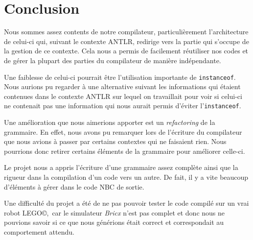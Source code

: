 \section{Conclusion}

Nous sommes assez contents de notre compilateur, particulièrement l'architecture de celui-ci qui, suivant le contexte ANTLR, redirige vers la partie qui s'occupe de la gestion de ce contexte. Cela nous a permis de facilement réutiliser nos codes et de gérer la plupart des parties du compilateur de manière indépendante.

Une faiblesse de celui-ci pourrait être l'utilisation importante de \texttt{instanceof}. Nous aurions pu regarder à une alternative suivant les informations qui étaient contenues dans le contexte ANTLR sur lequel on travaillait pour voir si celui-ci ne contenait pas une information qui nous aurait permis d'éviter l'\texttt{instanceof}.

 Une amélioration que nous aimerions apporter est un \emph{refactoring} de la grammaire. En effet, nous avons pu remarquer lors de l'écriture du compilateur que nous avions à passer par certains contextes qui ne faisaient rien. Nous pourrions donc retirer certains éléments de la grammaire pour améliorer celle-ci.
 
 Le projet nous a appris l'écriture d'une grammaire assez complète ainsi que la rigueur dans la compilation d'un code vers un autre. De fait, il y a vite beaucoup d'éléments à gérer dans le code NBC de sortie.
 
 Une difficulté du projet a été de ne pas pouvoir tester le code compilé sur un vrai robot LEGO\copyright,\ car le simulateur \emph{Bricx} n'est pas complet et donc nous ne pouvions savoir si ce que nous générions était correct et correspondait au comportement attendu. 
